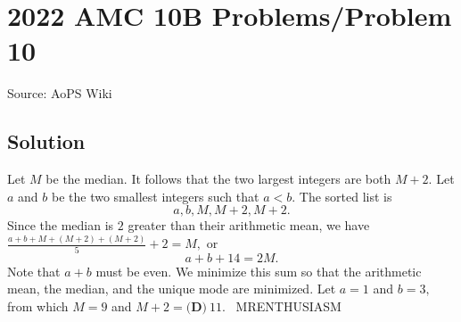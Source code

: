 \documentclass[12pt]{article}
\begin{document}
\section*{{2022 AMC 10B Problems/Problem 10}}
Source: AoPS Wiki

\subsection*{Solution}
Let $M$ be the median. It follows that the two largest integers are both $M+2.$ Let $a$ and $b$ be the two smallest integers such that $a<b.$ The sorted list is \[a,b,M,M+2,M+2.\] Since the median is $2$ greater than their arithmetic mean, we have $\frac{a+b+M+(M+2)+(M+2)}{5}+2=M,$ or \[a+b+14=2M.\] Note that $a+b$ must be even. We minimize this sum so that the arithmetic mean, the median, and the unique mode are minimized. Let $a=1$ and $b=3,$ from which $M=9$ and $M+2=\boxed{\textbf{(D)}\ 11}.$ ~MRENTHUSIASM
\end{document}
